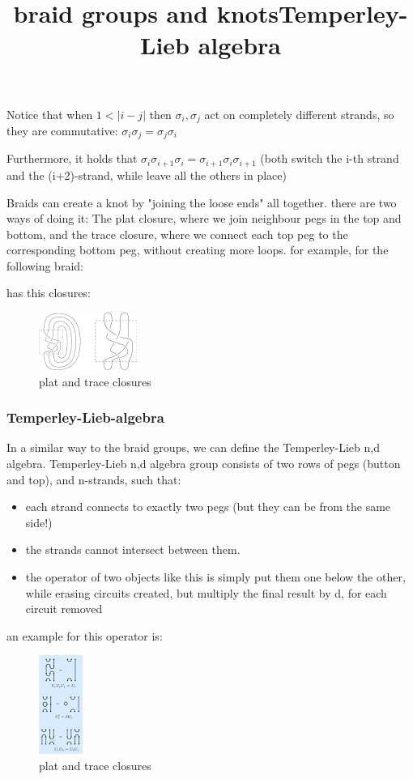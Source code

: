 \documentclass{article}
\begin{document}
Notice that when $1 < |i - j|$ then $\sigma_{i}, \sigma_{j}$ act on completely different strands, so they are commutative: $\sigma_{i}\sigma_{j} = \sigma_{j}\sigma_{i}$

Furthermore, it holds that $\sigma_{i}\sigma_{i+1}\sigma_{i} = \sigma_{i+1}\sigma_{i}\sigma_{i+1}$
(both switch the i-th strand and the (i+2)-strand, while leave all the others in place)


\title{braid groups and knots}
Braids can create a knot by "joining the loose ends" all together. there are two ways of doing it:
The plat closure, where we join neighbour pegs in the top and bottom, and the trace closure, where we connect each top peg to the corresponding bottom peg, without creating more loops.
for example, for the following braid: 

\begin{center}
\end{center} 
has this closures:
\begin{figure}
\includegraphics[scale=0.5]{closures} 
\caption{plat and trace closures}
\end{figure}



\subsubsection{Temperley-Lieb-algebra}
\title{Temperley-Lieb algebra}
In a similar way to the braid groups, we can define the Temperley-Lieb {n,d} algebra.
Temperley-Lieb {n,d} algebra group consists of two rows of pegs (button and top), and n-strands, such that:
\begin{itemize}
\item each strand connects to exactly two pegs (but they can be from the same side!)
\item the strands cannot intersect between them.
\item the operator of two objects like this is simply put them one below the other, 
while erasing circuits created, but multiply the final result by d, for each circuit removed
\end{itemize}
an example for this operator is:
\begin{figure}
\includegraphics[scale=0.5]{tempely_lieb_operator} 
\caption{plat and trace closures}
\end{figure}
\end{document}
